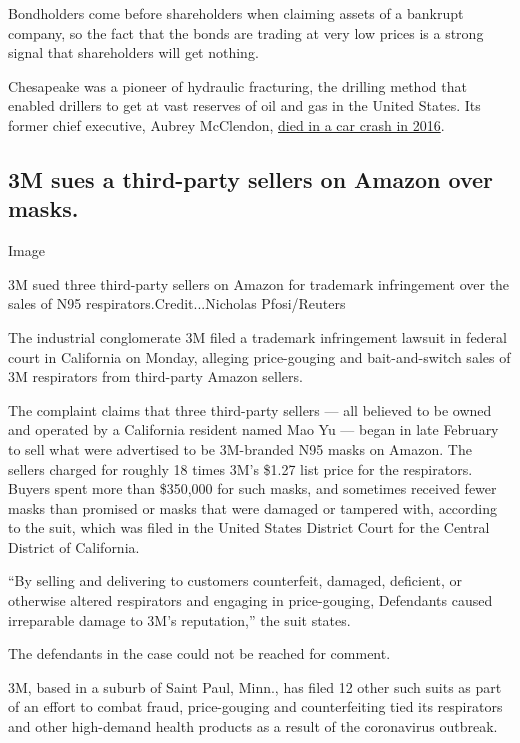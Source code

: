Bondholders come before shareholders when claiming assets of a bankrupt
company, so the fact that the bonds are trading at very low prices is a
strong signal that shareholders will get nothing.

Chesapeake was a pioneer of hydraulic fracturing, the drilling method
that enabled drillers to get at vast reserves of oil and gas in the
United States. Its former chief executive, Aubrey McClendon,
\href{https://www.nytimes3xbfgragh.onion/2016/03/04/business/energy-environment/aubrey-mcclendon-restless-and-reckless-wildcatter-was-deal-making-to-the-end.html}{died
in a car crash in 2016}.

\hypertarget{3m-sues-a-third-party-sellers-on-amazon-over-masks}{%
\subsection{3M sues a third-party sellers on Amazon over
masks.}\label{3m-sues-a-third-party-sellers-on-amazon-over-masks}}

Image

3M sued three third-party sellers on Amazon for trademark infringement
over the sales of N95 respirators.Credit...Nicholas Pfosi/Reuters

The industrial conglomerate 3M filed a trademark infringement lawsuit in
federal court in California on Monday, alleging price-gouging and
bait-and-switch sales of 3M respirators from third-party Amazon sellers.

The complaint claims that three third-party sellers --- all believed to
be owned and operated by a California resident named Mao Yu --- began in
late February to sell what were advertised to be 3M-branded N95 masks on
Amazon. The sellers charged for roughly 18 times 3M's \$1.27 list price
for the respirators. Buyers spent more than \$350,000 for such masks,
and sometimes received fewer masks than promised or masks that were
damaged or tampered with, according to the suit, which was filed in the
United States District Court for the Central District of California.

``By selling and delivering to customers counterfeit, damaged,
deficient, or otherwise altered respirators and engaging in
price-gouging, Defendants caused irreparable damage to 3M's
reputation,'' the suit states.

The defendants in the case could not be reached for comment.

3M, based in a suburb of Saint Paul, Minn., has filed 12 other such
suits as part of an effort to combat fraud, price-gouging and
counterfeiting tied its respirators and other high-demand health
products as a result of the coronavirus outbreak.

